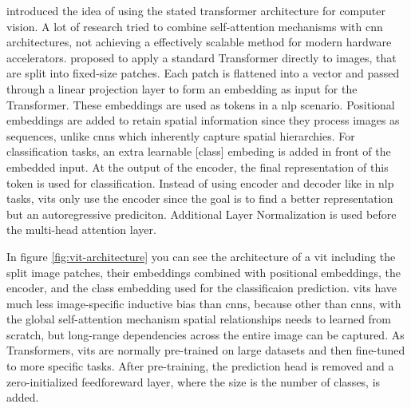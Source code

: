 \documentclass[conference]{IEEEtran}
\begin{document}
  \citeauthor{visiontransformers2021} introduced the idea of using the stated transformer architecture for computer vision. A lot of research tried to combine self-attention mechanisms with \ac{cnn} architectures, not achieving a effectively scalable method for modern hardware accelerators. \cite{visiontransformers2021} proposed to apply a standard Transformer directly to images, that are split into fixed-size patches. Each patch is flattened into a vector and passed through a linear projection layer to form an embedding as input for the Transformer. These embeddings are used as tokens in a \ac{nlp} scenario. Positional embeddings are added to retain spatial information since they process images as sequences, unlike \acp{cnn} which inherently capture spatial hierarchies. For classification tasks, an extra learnable [class] embeding is added in front of the embedded input. At the output of the encoder, the final representation of this token is used for classification. Instead of using encoder and decoder like in \ac{nlp} tasks, \acp{vit} only use the encoder since the goal is to find a better representation but an autoregressive prediciton. Additional Layer Normalization is used before the multi-head attention layer. \cite{vit-state-challenges} 
  
  In figure \ref{fig:vit-architecture} you can see the architecture of a \ac{vit} including the split image patches, their embeddings combined with positional embeddings, the encoder, and the class embedding used for the classificaion prediction.
  \acp{vit} have much less image-specific inductive bias than \acp{cnn}, because other than \acp{cnn}, with the global self-attention mechanism spatial relationships needs to learned from scratch, but long-range dependencies across the entire image can be captured. As Transformers, \acp{vit} are normally pre-trained on large datasets and then fine-tuned to more specific tasks. After pre-training, the prediction head is removed and a zero-initialized feedforeward layer, where the size is the number of classes, is added.
\end{document}
